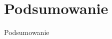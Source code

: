 \documentclass{beamer}
\begin{document}
\section{Podsumowanie}

\begin{frame}{}
\begin{center}
\huge{Podsumowanie}
\end{center}
\end{frame}
\end{document}
